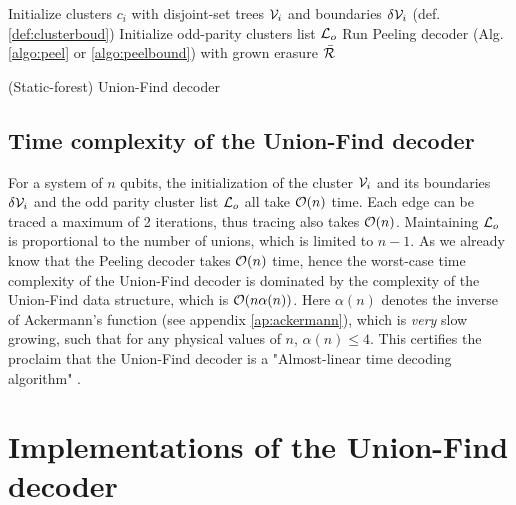 \begin{algorithm}[htb]
  \BlankLine
  \BlankLine
  Initialize clusters $c_i$ with disjoint-set trees $\mathcal{V}_i$ and boundaries $\delta \mathcal{V}_i$ (def. \ref{def:clusterboud})\;
  Initialize odd-parity clusters list $\mathcal{L}_o$\;
  \BlankLine
  Run Peeling decoder (Alg. \ref{algo:peel} or \ref{algo:peelbound}) with grown erasure $\bar{\mathcal{R}}$
  \BlankLine
  \caption{(Static-forest) Union-Find decoder \cite{delfosse2017almost}}\label{algo:suf}
\end{algorithm}

\subsection{Time complexity of the Union-Find decoder}

For a system of $n$ qubits, the initialization of the cluster $\mathcal{V}_i$ and its boundaries $\delta \mathcal{V}_i$ and the odd parity cluster list $\mathcal{L}_o$ all take $\mathcal{O}(n)$ time. Each edge can be traced a maximum of 2 iterations, thus tracing also takes $\mathcal{O}(n)$. Maintaining $\mathcal{L}_o$ is proportional to the number of unions, which is limited to $n-1$. As we already know that the Peeling decoder takes $\mathcal{O}(n)$ time, hence the worst-case time complexity of the Union-Find decoder is dominated by the complexity of the Union-Find data structure, which is $\mathcal{O}(n\alpha(n))$. Here $\alpha(n)$ denotes the inverse of Ackermann's function (see appendix \ref{ap:ackermann}), which is \emph{very} slow growing, such that for any physical values of $n$, $\alpha(n) \leq 4$. This certifies the proclaim that the Union-Find decoder is a "Almost-linear time decoding algorithm" \cite{delfosse2017almost}. 

\section{Implementations of the Union-Find decoder}\label{sec:ufimplementations}

